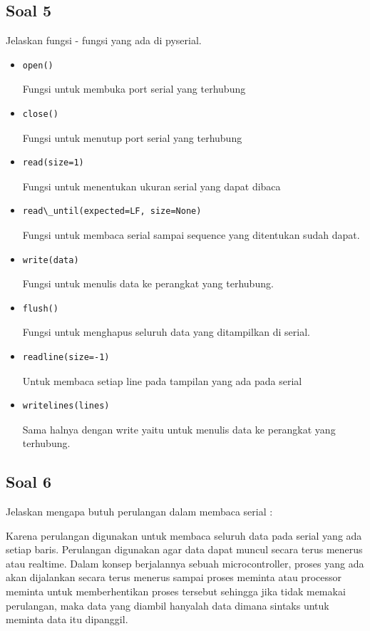 \subsection{Soal 5}
Jelaskan fungsi - fungsi yang ada di pyserial.
\begin{itemize}
	\item \begin{verbatim}open()\end{verbatim} 
	Fungsi untuk membuka port serial yang terhubung
	\item \begin{verbatim}close()\end{verbatim} 
	Fungsi untuk menutup port serial yang terhubung
	\item \begin{verbatim}read(size=1) \end{verbatim}
	Fungsi untuk menentukan ukuran serial yang dapat dibaca
	\item \begin{verbatim}read\_until(expected=LF, size=None) \end{verbatim}
	Fungsi untuk membaca serial sampai sequence yang ditentukan sudah dapat.
	\item \begin{verbatim}write(data) \end{verbatim}
	Fungsi untuk menulis data ke perangkat yang terhubung.
	\item \begin{verbatim}flush() \end{verbatim}
	Fungsi untuk menghapus seluruh data yang ditampilkan di serial.
	\item \begin{verbatim}readline(size=-1) \end{verbatim}
	Untuk membaca setiap line pada tampilan yang ada pada serial
	\item \begin{verbatim}writelines(lines) \end{verbatim}
	Sama halnya dengan write yaitu untuk menulis data ke perangkat yang terhubung.
\end{itemize}
\subsection{Soal 6}
Jelaskan mengapa butuh perulangan dalam membaca serial : 

Karena perulangan digunakan untuk membaca seluruh data pada serial yang ada setiap baris. Perulangan digunakan agar data dapat muncul secara terus menerus atau realtime. Dalam konsep berjalannya sebuah microcontroller, proses yang ada akan dijalankan secara terus menerus sampai proses meminta atau processor meminta untuk memberhentikan proses tersebut sehingga jika tidak memakai perulangan, maka data yang diambil hanyalah data dimana sintaks untuk meminta data itu dipanggil. 
